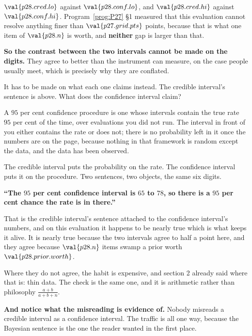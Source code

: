 \begin{fr}

$\val{p28.cred.lo}$ against $\val{p28.conf.lo}$, and $\val{p28.cred.hi}$
against $\val{p28.conf.hi}$. Program~\ref{prog:P27} §1 measured that this
evaluation cannot resolve anything finer than $\val{p27.grid.pts}$ points,
because that is what one item of $\val{p28.n}$ is worth, and \textbf{neither}
gap is larger than that.

\textbf{So the contrast between the two intervals cannot be made on the
digits.} They agree to better than the instrument can measure, on the case
people usually meet, which is precisely why they are conflated.

It has to be made on what each one claims instead. The credible interval's
sentence is above. What does the confidence interval claim?
\dotline
\nextframe
\end{fr}

\begin{fr}

A $95$ per cent confidence procedure is one whose intervals contain the true
rate $95$ per cent of the time, over evaluations you did not run. The
interval in front of you either contains the rate or does not; there is no
probability left in it once the numbers are on the page, because nothing in
that framework is random except the data, and the data has been observed.

The credible interval puts the probability on the rate. The confidence
interval puts it on the procedure. Two sentences, two objects, the same six
digits.

\end{fr}

\begin{fr}
\begin{trapbox}
\textbf{\enquote{The $95$ per cent confidence interval is $65$ to $78$, so
there is a $95$ per cent chance the rate is in there.}}

That is the credible interval's sentence attached to the confidence
interval's numbers, and on this evaluation it happens to be nearly true
\dash{} which is what keeps it alive. It is nearly true because the two
intervals agree to half a point here, and they agree because
$\val{p28.n}$ items swamp a prior worth $\val{p28.prior.worth}$.

Where they do not agree, the habit is expensive, and section 2 already said
where that is: thin data. The check is the same one, and it is arithmetic
rather than philosophy \dash{} $\frac{a+b}{a+b+n}$.

\textbf{And notice what the misreading is evidence of.} Nobody misreads a
credible interval as a confidence interval. The traffic is all one way,
because the Bayesian sentence is the one the reader wanted in the first
place.
\end{trapbox}
\end{fr}

